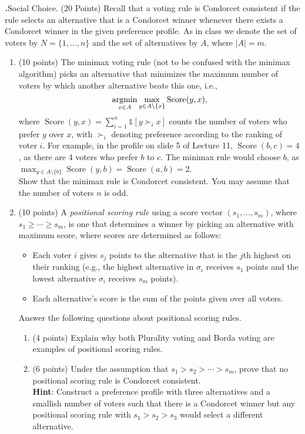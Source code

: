 \documentclass[12pt]{amsart}
\newenvironment{statement}[1]{\smallskip\noindent\color[rgb]{0.0,0.0,0.0} {\bf #1.}}{}
\newcommand{\1}{\mathds{1}}
\begin{document}
\begin{statement}{2} \textit{Social Choice.} (20 Points) 
Recall that a voting rule is Condorcet consistent if the rule selects an alternative that is a Condorcet winner whenever there exists a Condorcet winner in the given preference profile. As in class we denote the set of voters by $N=\{1,\ldots,n\}$ and the set of alternatives by $A$, where $|A|=m$.

\begin{enumerate}
    \item (10 points) The minimax voting rule (not to be confused with the minimax algorithm) picks an alternative that minimizes the maximum number of voters by which another alternative beats this one, i.e., 
    \[ \operatornamewithlimits{argmin}_{x\in A}\max_{y\in A\setminus\{x\}} \operatorname{Score}(y, x),\]
    where $\operatorname{Score}(y, x) = \sum_{i=1}^n \1[y\succ_i x]$ counts the number of voters who prefer $y$ over $x$, with $\succ_i$ denoting preference according to the ranking of voter $i$. For example, in the profile on slide 5 of Lecture 11, $\operatorname{Score}(b,c)=4$, as there are 4 voters who prefer $b$ to $c$. The minimax rule would choose $b$, as $\max_{y\in A\setminus\{b\}} \operatorname{Score}(y, b)=\operatorname{Score}(a,b)=2$.\\ 
    Show that the minimax rule is Condorcet consistent. You may assume that the number of voters $n$ is odd. 
    \item (10 points) A \textit{positional scoring rule} using a score vector $(s_1, \ldots, s_m)$, where $s_1 \geq \cdots \geq s_m$, is one that determines a winner by picking an alternative with maximum score, where scores are determined as follows:
    \begin{itemize}
        \item Each voter $i$ gives $s_j$ points to the alternative that is the $j$th highest on their ranking (e.g., the highest alternative in $\sigma_i$ receives $s_1$ points and the lowest alternative $\sigma_i$ receives $s_m$ points).
        \item Each alternative's score is the sum of the points given over all voters.
    \end{itemize}
    Answer the following questions about positional scoring rules.
    \begin{enumerate}
        \item (4 points) Explain why both Plurality voting and Borda voting are examples of positional scoring rules.
        \item (6 points) Under the assumption that $s_1>s_2>\cdots >s_m$, prove that no positional scoring rule is Condorcet consistent.\\
        \textbf{Hint}: Construct a preference profile with three alternatives and a smallish number of voters such that there is a Condorcet winner but any positional scoring rule with $s_1>s_2>s_3$ would select a different alternative. 
    \end{enumerate}
\end{enumerate}
\end{statement}
\end{document}

